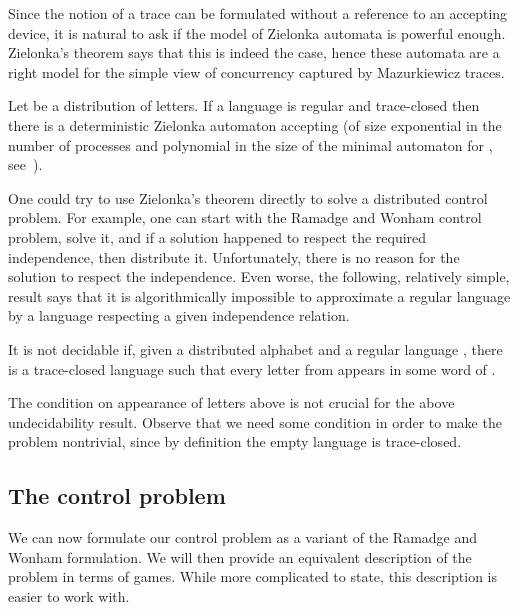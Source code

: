 \documentclass{llncs}
\begin{document}
Since the notion of a trace can be formulated without a reference to an
accepting device, it is natural to ask if the model of Zielonka
automata is powerful enough. Zielonka's theorem says that this is
indeed the case, hence these automata are a right model for
the simple view of concurrency captured by Mazurkiewicz traces. 



\begin{theorem}\cite{zie87}
  Let  be a distribution of
  letters. If a language  is regular and trace-closed then there is a
  deterministic Zielonka automaton accepting  (of size exponential
  in the number of processes and polynomial in the size of the minimal
  automaton for , see~\cite{ggmw10}). 
\end{theorem}

\medskip

One could try to use Zielonka's theorem directly to solve a
distributed control problem. For example, one can start with the
Ramadge and Wonham control problem, solve it, and if a solution happened to
respect the required independence, then distribute
it. Unfortunately, there is no reason for the solution to respect the
independence. Even worse, the following, relatively simple, result
says that it is algorithmically impossible to approximate a
regular language by a language respecting a given independence
relation.

\medskip

\begin{theorem}\cite{SEM03}
  It is not decidable if, given a distributed alphabet and a
  regular language , there is a trace-closed language
   such that every letter from  appears in some
  word of .
\end{theorem}

\medskip

The condition on appearance of letters above is not crucial for the
above undecidability result. Observe
that we need some condition in order to make the problem nontrivial,
since by definition the empty language is trace-closed.





\subsection{The control problem}

We can now formulate our control problem as a variant of the 
Ramadge and Wonham formulation. We will then provide an equivalent
description of the problem in terms of games. While more complicated
to state, this description is easier to work with. 
\end{document}

